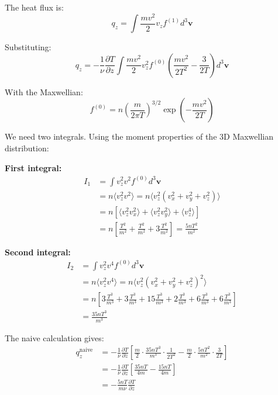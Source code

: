 \documentclass[12pt,a4paper]{article}
\newcommand{\vect}[1]{\mathbf{#1}}
\begin{document}
The heat flux is:
\begin{equation}
q_z = \int \frac{mv^2}{2} v_z f^{(1)} d^3\vect{v}
\label{eq:qz_appendix}
\end{equation}

Substituting:
\begin{equation}
q_z = -\frac{1}{\nu} \frac{\partial T}{\partial z} \int \frac{mv^2}{2} v_z^2 f^{(0)} \left(\frac{mv^2}{2T^2} - \frac{3}{2T}\right) d^3\vect{v}
\label{eq:qz_substituted}
\end{equation}

With the Maxwellian:
\begin{equation}
f^{(0)} = n\left(\frac{m}{2\pi T}\right)^{3/2} \exp\left(-\frac{mv^2}{2T}\right)
\label{eq:maxwellian_appendix}
\end{equation}

We need two integrals. Using the moment properties of the 3D Maxwellian distribution:

\textbf{First integral:}
\begin{align}
I_1 &= \int v_z^2 v^2 f^{(0)} d^3\vect{v}\label{eq:I1_def}\\
&= n \langle v_z^2 v^2 \rangle = n \langle v_z^2 (v_x^2 + v_y^2 + v_z^2) \rangle\label{eq:I1_expansion}\\
&= n [\langle v_z^2 v_x^2 \rangle + \langle v_z^2 v_y^2 \rangle + \langle v_z^4 \rangle]\label{eq:I1_terms}\\
&= n \left[\frac{T^2}{m^2} + \frac{T^2}{m^2} + 3\frac{T^2}{m^2}\right] = \frac{5nT^2}{m^2}\label{eq:I1_result}
\end{align}

\textbf{Second integral:}
\begin{align}
I_2 &= \int v_z^2 v^4 f^{(0)} d^3\vect{v}\label{eq:I2_def}\\
&= n \langle v_z^2 v^4 \rangle = n \langle v_z^2 (v_x^2 + v_y^2 + v_z^2)^2 \rangle\label{eq:I2_expansion}\\
&= n [3\frac{T^3}{m^3} + 3\frac{T^3}{m^3} + 15\frac{T^3}{m^3} + 2\frac{T^3}{m^3} + 6\frac{T^3}{m^3} + 6\frac{T^3}{m^3}]\label{eq:I2_terms}\\
&= \frac{35nT^3}{m^3}\label{eq:I2_result}
\end{align}

The naive calculation gives:
\begin{align}
q_z^{\text{naive}} &= -\frac{1}{\nu} \frac{\partial T}{\partial z} \left[\frac{m}{2} \cdot \frac{35nT^3}{m^3} \cdot \frac{1}{2T^2} - \frac{m}{2} \cdot \frac{5nT^2}{m^2} \cdot \frac{3}{2T}\right]\label{eq:qz_naive_calc}\\
&= -\frac{1}{\nu} \frac{\partial T}{\partial z} \left[\frac{35nT}{4m} - \frac{15nT}{4m}\right]\label{eq:qz_naive_simplified}\\
&= -\frac{5nT}{m\nu} \frac{\partial T}{\partial z}\label{eq:qz_naive_final}
\end{align}
\end{document}
